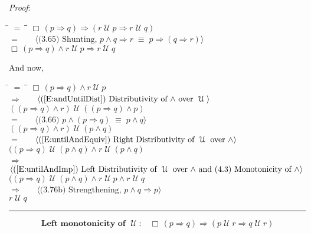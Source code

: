 \documentclass[12pt, fleqn, leqno]{article}
\newcommand{\lgap}{2pt}                             %
\newcommand{\mymathindent}{24pt}                    %
\newcommand{\equivs}{\ensuremath{\;\equiv\;}}       %
\newcommand{\impl}{\ensuremath{\Rightarrow}}        %
\newcommand{\Until}{\;\mathcal{U}\;}
\newcommand{\Always}{\Box\,}
\newcommand{\myqed}{\rule[-.23ex]{1.2ex}{2.0ex}}
\newcommand{\myqedtab}{\hspace{384pt}}              %
\newcommand{\Gll} {\langle}                         %
\newcommand{\Ggg} {\rangle}                         %
\newcommand{\Hint}[1]     {\ \ \ $\Gll              \mbox{#1} \Ggg$ }   %
\begin{document}
\emph{Proof}:
\begin{tabbing}
\hspace{\mymathindent} \= $= \;$ \= \myqedtab \= \kill
  \> \>   $\Always (p \impl q) \impl (r \Until p \impl r \Until q)$\\[\lgap]
  \> $=$  \>  \Hint{(3.65) Shunting, $p\land q \impl r \equivs p \impl (q \impl r)$}\\[\lgap]
  \> \>   $\Always (p \impl q) \land r \Until p \impl r \Until q$
\end{tabbing}
And now,
\begin{tabbing}
\hspace{\mymathindent} \= $= \;$ \= \myqedtab \= \kill
  \> \>   $\Always (p \impl q) \land r \Until p$\\[\lgap]
  \> $\impl$  \>  \Hint{(\ref{E:andUntilDist}) Distributivity of $\land$ over $\Until$}\\[\lgap]
  \> \>   $((p \impl q) \land r) \Until ((p \impl q) \land p)$\\[\lgap]
  \> $=$  \>  \Hint{(3.66) $p\land (p \impl q) \equivs  p \land q$}\\[\lgap]
  \> \>   $((p \impl q) \land r) \Until (p \land q)$\\[\lgap]
  \> $=$  \>  \Hint{(\ref{E:untilAndEquiv}) Right Distributivity of $\Until$ over $\land$}\\[\lgap]
  \> \>   $((p \impl q) \Until (p \land q) \land r \Until (p \land q)$\\[\lgap]
  \> $\impl$  \>  \Hint{(\ref{E:untilAndImp}) Left Distributivity of $\Until$ over $\land$ and (4.3) Monotonicity of $\land$}\\[\lgap]
  \> \>   $((p \impl q) \Until (p \land q) \land r \Until p \land r \Until q$\\[\lgap]
  \> $\impl$ \> \Hint{(3.76b) Strengthening, $p\land q \impl p$} \\[\lgap]
  \> \>   $r \Until q$ \quad \myqed
\end{tabbing}
\begin{equation}\label{E:leftMonoUntil}
\textbf{Left monotonicity of $\Until$:}\quad \Always (p \impl q) \impl (p \Until r \impl q \Until r)
\end{equation}
\end{document}
